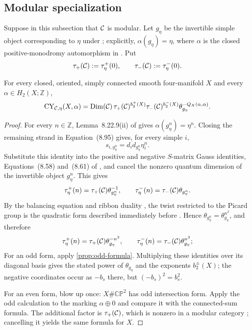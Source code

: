 \subsection{Modular specialization}
\label{subsec:modular-specialization}

Suppose in this subsection that $\mathcal{C}$ is modular.  Let $g_\eta$ be the
invertible simple object corresponding to $\eta$ under
\cite[Lemma~8.22.9(iii)]{EGNO2015}; explicitly,
$\alpha(g_\eta)=\eta$, where $\alpha$ is the closed positive-monodromy
automorphism in \cite[Equation~(8.95)]{EGNO2015}.  Put
\[
  \tau_+(\mathcal{C}):=\tau_\eta^+(0),
  \qquad
  \tau_-(\mathcal{C}):=\tau_\eta^-(0).
\]

\begin{theorem}
\label{prop:modular-formula}
For every closed, oriented, simply connected smooth four-manifold $X$ and
every $\alpha\in H_2(X;\mathbb Z)$,
\[
  \operatorname{CY}_{\mathcal{C},\eta}(X,\alpha)
  =\operatorname{Dim}(\mathcal{C})\,
   \tau_+(\mathcal{C})^{b_2^+(X)}
   \tau_-(\mathcal{C})^{b_2^-(X)}
   \theta_{g_\eta}^{-Q_X(\alpha,\alpha)}.
\]
\end{theorem}

\begin{proof}
For every $n\in\mathbb Z$, Lemma~8.22.9(ii) of \cite{EGNO2015} gives
$\alpha(g_\eta^n)=\eta^n$.  Closing the remaining strand in
Equation~(8.95) gives, for every simple $i$,
\[
  s_{i,g_\eta^n}=d_i d_{g_\eta^n}\eta_i^n.
\]
Substitute this identity into the positive and negative $S$-matrix Gauss
identities, Equations~(8.58) and~(8.61) of \cite{EGNO2015}, and cancel the
nonzero quantum dimension of the invertible object $g_\eta^n$.  This gives
\[
  \tau_\eta^+(n)=\tau_+(\mathcal{C})\theta_{g_\eta^n}^{-1},
  \qquad
  \tau_\eta^-(n)=\tau_-(\mathcal{C})\theta_{g_\eta^n}.
\]
By the balancing equation and ribbon duality
\cite[Definition~8.10.1]{EGNO2015}, the twist restricted to the Picard group
is the quadratic form described immediately before
\cite[Definition~8.4.1]{EGNO2015}.  Hence
$\theta_{g_\eta^n}=\theta_{g_\eta}^{n^2}$, and therefore
\[
  \tau_\eta^+(n)=\tau_+(\mathcal{C})\theta_{g_\eta}^{-n^2},
  \qquad
  \tau_\eta^-(n)=\tau_-(\mathcal{C})\theta_{g_\eta}^{n^2};
\]
For an odd form, apply \cref{prop:odd-formula}.  Multiplying these identities
over its diagonal basis gives the stated power of $\theta_{g_\eta}$ and the
exponents $b_2^\pm(X)$; the negative coordinates occur as $-b_s$ there, but
$(-b_s)^2=b_s^2$.

For an even form, blow up once: $X\#\mathbb{CP}^2$ has odd intersection
form.  Apply the odd calculation to the marking $\alpha\oplus0$ and compare
it with the connected-sum formula.  The additional factor is
$\tau_+(\mathcal{C})$, which is nonzero in a modular category
\cite[Proposition~8.15.4]{EGNO2015}; cancelling it yields the same formula
for $X$.
\end{proof}


